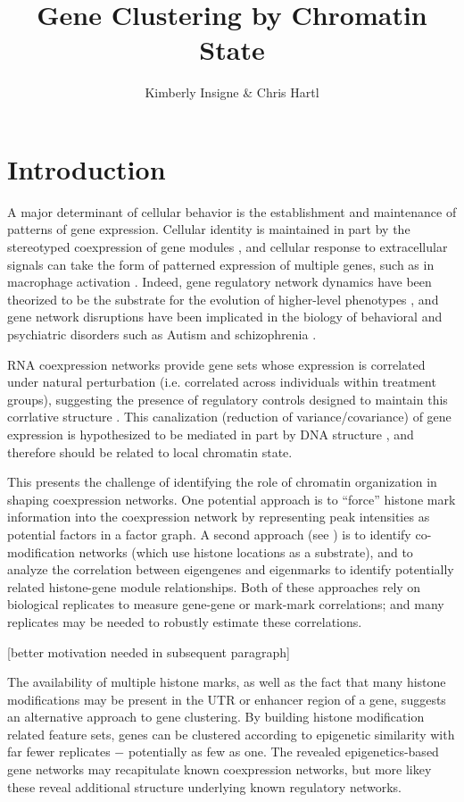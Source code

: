 \documentclass[9pt,twocolumn]{article}
\title{Gene Clustering by Chromatin State}
\author{Kimberly Insigne \& Chris Hartl}
\begin{document}
\maketitle

\section*{Introduction}
A major determinant of cellular behavior is the establishment and maintenance of patterns of gene expression. Cellular identity is maintained in part by the stereotyped coexpression of gene modules \cite{mason09}, and cellular response to extracellular signals can take the form of patterned expression of multiple genes, such as in macrophage activation \cite{xue2014}. Indeed, gene regulatory network dynamics have been theorized to be the substrate for the evolution of higher-level phenotypes \cite{davidson11}, and gene network disruptions have been implicated in the biology of behavioral and psychiatric disorders such as Autism \cite{parikshak13}\cite{willsey13} and schizophrenia \cite{gulsner13}.

RNA coexpression networks \cite{rnacn-review} provide gene sets whose expression is correlated under natural perturbation (i.e. correlated across individuals within treatment groups), suggesting the presence of regulatory controls designed to maintain this corrlative structure \cite{rnacn-regulation}. This canalization (reduction of variance/covariance) of gene expression is hypothesized to be mediated in part by DNA structure \cite{gene-structure-expression-reg}, and therefore should be related to local chromatin state.

This presents the challenge of identifying the role of chromatin organization in shaping coexpression networks. One potential approach is to ``force'' histone mark information into the coexpression network by representing peak intensities as potential factors in a factor graph. A second approach (see \cite{histone-networks}) is to identify co-modification networks (which use histone locations as a substrate), and to analyze the correlation between eigengenes and eigenmarks to identify potentially related histone-gene module relationships. Both of these approaches rely on biological replicates to measure gene-gene or mark-mark correlations; and many replicates may be needed to robustly estimate these correlations.

[better motivation needed in subsequent paragraph]

The availability of multiple histone marks, as well as the fact that many histone modifications may be present in the UTR or enhancer region of a gene, suggests an alternative approach to gene clustering. By building histone modification related feature sets, genes can be clustered according to epigenetic similarity with far fewer replicates $-$ potentially as few as one. The revealed epigenetics-based gene networks may recapitulate known coexpression networks, but more likey these reveal additional structure underlying known regulatory networks.
\end{document}
